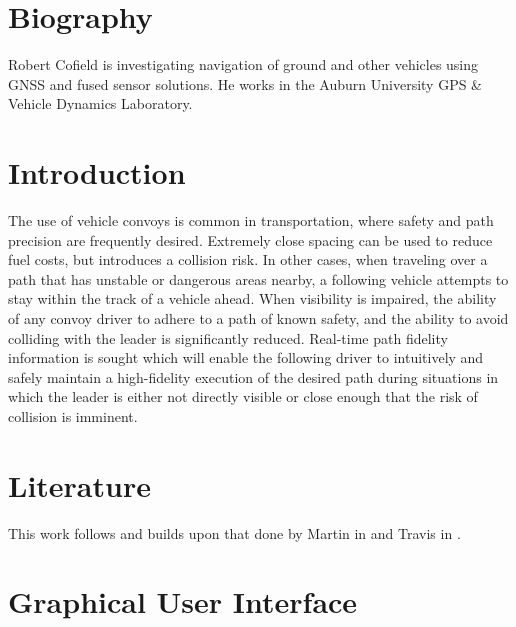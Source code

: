 \documentclass[twocolumn,10pt]{article}
\begin{document}

\section*{Biography}

  Robert Cofield is investigating navigation of ground and other vehicles using GNSS and fused sensor solutions.  He works in the Auburn University GPS \& Vehicle Dynamics Laboratory.


\section*{Introduction} \label{sec:intro}

  The use of vehicle convoys is common in transportation, where safety and path precision are frequently desired.  Extremely close spacing can be used to reduce fuel costs, but introduces a collision risk.  In other cases, when traveling over a path that has unstable or dangerous areas nearby, a following vehicle attempts to stay within the track of a vehicle ahead.  When visibility is impaired, the ability of any convoy driver to adhere to a path of known safety, and the ability to avoid colliding with the leader is significantly reduced.  Real-time path fidelity information is sought which will enable the following driver to intuitively and safely maintain a high-fidelity execution of the desired path during situations in which the leader is either not directly visible or close enough that the risk of collision is imminent.


\section*{Literature} \label{sec:lit}

  This work follows and builds upon that done by Martin in \cite{ScottThesis} and Travis in \cite{travisdiss}. 


\section*{Graphical User Interface} \label{sec:gui}
\end{document}
